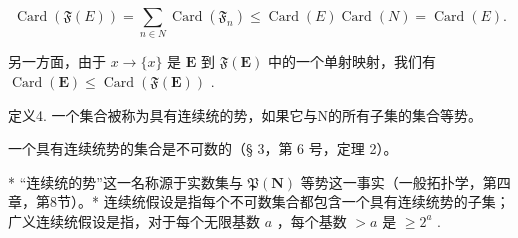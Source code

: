 \[
\operatorname{Card} (\mathfrak {F} (E)) = \sum_ {n \in N} \operatorname{Card} (\mathfrak {F} _ {n}) \leqslant \operatorname{Card} (E) \operatorname{Card} (N) = \operatorname{Card} (E).
\]

另一方面，由于 \(x \to \{x\}\) 是 \(\mathbf{E}\) 到 \(\mathfrak{F}(\mathbf{E})\) 中的一个单射映射，我们有 \(\operatorname{Card}(\mathbf{E}) \leqslant \operatorname{Card}(\mathfrak{F}(\mathbf{E}))\) .

定义4. 一个集合被称为具有连续统的势，如果它与N的所有子集的集合等势。

一个具有连续统势的集合是不可数的（§ 3，第 6 号，定理 2）。

* “连续统的势”这一名称源于实数集与 \(\mathfrak{P}(\mathbf{N})\) 等势这一事实（一般拓扑学，第四章，第8节）。* 连续统假设是指每个不可数集合都包含一个具有连续统势的子集；广义连续统假设是指，对于每个无限基数 \(a\) ，每个基数 \(>a\) 是 \(\geqslant 2^{a}\) .

